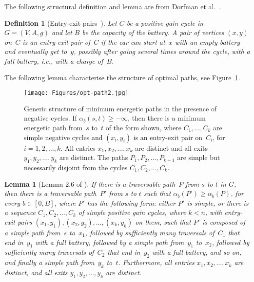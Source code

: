 \documentclass[11pt]{article}
\newtheorem{lemma}[theorem]{Lemma}
\newtheorem{definition}[theorem]{Definition}
\begin{document}
The following structural definition and lemma are from Dorfman et al.~\cite{DorfmanKTZ23}.

\begin{definition}[Entry-exit pairs~\cite{DorfmanKTZ23}]\label{D-entry-exit}
Let $C$ be a positive gain cycle in $G=(V,A,g)$ and let $B$ be the capacity of the battery. A pair of vertices $(x,y)$ on~$C$ is an \emph{entry-exit} pair of~$C$ if the car can start at~$x$ with an empty battery and eventually get to~$y$, possibly after going several times around the cycle, with a full battery, i.e., with a charge of~$B$.
\end{definition}
 
The following lemma characterise the structure of optimal paths, see Figure~\ref{fig:opt-path}.

\begin{figure}[t]
    \centering
    \texttt{[image: Figures/opt-path2.jpg]}
    \caption{Generic structure of minimum energetic paths in the presence of negative cycles. If $\alpha_b(s,t)\ge -\infty$, then there is a minimum energetic path from~$s$ to~$t$ of the form shown, where $C_1,\ldots,C_k$ are simple negative cycles and $(x_i,y_i)$ is an entry-exit pair on~$C_i$, for $i=1,2,\ldots,k$. All entries $x_1,x_2,\ldots,x_k$ are distinct and all exits $y_1,y_2,\ldots,y_k$ are distinct. The paths $P_1,P_2,\ldots,P_{k+1}$ are simple but necessarily disjoint from the cycles $C_1,C_2,\ldots,C_k$.
    }
    \label{fig:opt-path}
\end{figure}

\begin{lemma}[Lemma 2.6 of \cite{DorfmanKTZ23}]\label{lemma:optimal-structure}
 If there is a traversable path~$P$ from $s$ to $t$ in $G$, then there is a traversable path~$P'$ from $s$ to $t$ such that $\alpha_b(P')\ge \alpha_b(P)$, for every $b \in [0,B]$, where $P'$ has the following form: either $P'$ is simple, or there is a sequence $C_1,C_2,\ldots,C_k$ of simple positive gain cycles, where $k<n$, with entry-exit pairs $(x_1,y_1),(x_2,y_2),\ldots,(x_k,y_k)$ on them, such that $P'$ is composed of a simple path from~$s$ to~$x_1$, followed by sufficiently many traversals of~$C_1$ that end in~$y_1$ with a full battery, followed by a simple path from~$y_1$ to~$x_2$, followed by sufficiently many traversals of~$C_2$ that end in~$y_2$ with a full battery, and so on, and finally a simple path from~$y_k$ to~$t$. Furthermore, all entries $x_1,x_2,\ldots,x_k$ are distinct, and all exits $y_1,y_2,\ldots,y_k$ are distinct.
\end{lemma}
\end{document}

